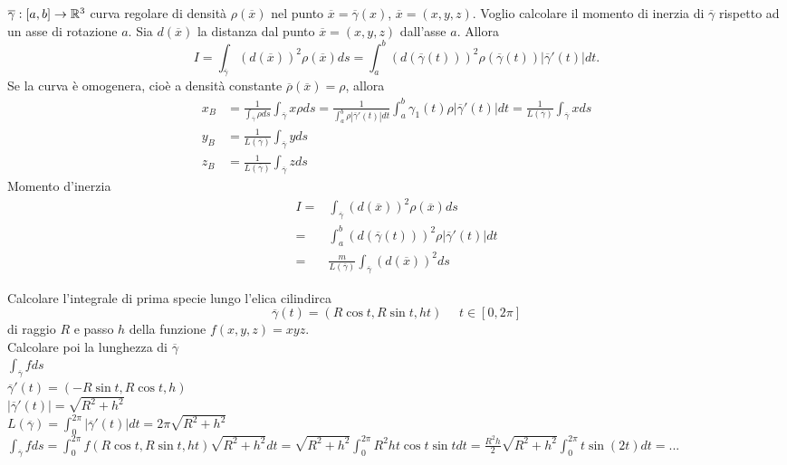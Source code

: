 $\overline{\gamma}:[a,b]\rightarrow \mathbb{R}^3$ curva regolare di densità $\rho(\overline{x}) $ nel punto $\overline{x}=\overline{\gamma}(x)$, $\overline{x}=(x,y,z)$. Voglio calcolare il momento di inerzia di $\overline{\gamma}$ rispetto ad un asse di rotazione $a$. Sia $d(\overline{x})$ la distanza dal punto $\overline{x}=(x,y,z)$ dall'asse $a$. Allora
\begin{equation*}
	I= \int_{\overline{\gamma}}(d(\overline{x}))^2 \rho(\overline{x})ds= \int_a^b (d(\overline{\gamma}(t)))^2 \rho (\overline{\gamma}(t))|\overline{\gamma}'(t)|dt.
\end{equation*}
Se la curva è omogenera, cioè a densità constante $\overline{\rho}(\overline{x})=\rho$, allora 
\begin{align*}
	x_B&= \frac{1}{\int_{\overline{\gamma}}\rho ds}\int_{\overline{\gamma}}x \rho ds = \frac{1}{\int_a^b\rho|\overline{\gamma}'(t)|dt}\int_a^b \gamma_1 (t) \rho |\overline{\gamma}'(t)|dt= \frac{1}{L(\overline{\gamma})}\int_{\overline{\gamma}}x ds\\
	y_B&=\frac{1}{L(\overline{\gamma})}\int_{\overline{\gamma}}y ds\\
	z_B&= \frac{1}{L(\overline{\gamma})}\int_{\overline{\gamma}}z ds
\end{align*}
Momento d'inerzia
\begin{align*}
	I=& \int_{\overline{\gamma}}(d(\overline{x}))^2\rho(\overline{x})ds\\
	=& \int_a^b (d(\overline{\gamma}(t)))^2 \rho|\overline{\gamma}'(t)|dt\\
	=& \frac{m}{L(\overline{\gamma})}\int_{\overline{\gamma}}(d(\overline{x}))^2 ds
\end{align*}


\begin{exbar}
\begin{example}
	Calcolare l'integrale di prima specie lungo l'elica cilindirca 
	\begin{equation*}
		\overline{\gamma}(t)=(R \cos t , R \sin t , h t)\,\,\,\,\,\,\,\,t \in [0,2\pi]
	\end{equation*}
	di raggio $R$ e passo $h$ della funzione $f(x,y,z)=xyz$.\\
	Calcolare poi la lunghezza di $\overline{\gamma}$\\
	$\int_{\overline{\gamma}} f ds$\\
	$\overline{\gamma}'(t)=(-R\sin t , R \cos t , h)$\\
	$|\overline{\gamma}'(t)|=\sqrt{R^2+h^2}$\\
	$L(\overline{\gamma})=\int_0^{2\pi}|\overline{\gamma}'(t)|dt=2\pi \sqrt{R^2+h^2}$\\
	$\int_{\overline{\gamma}} f ds = \int_0^{2\pi} f(R \cos t , R \sin t , h t)\sqrt{R^2 +h^2} dt= \sqrt{R^2 + h^2} \int_0^{2\pi} R^2h t \cos t \sin t dt = \frac{ R^2 h}{2}\sqrt{R^2+h^2}\int_0^{2\pi}t \sin (2t)dt=...
	$
\end{example}
\end{exbar}


